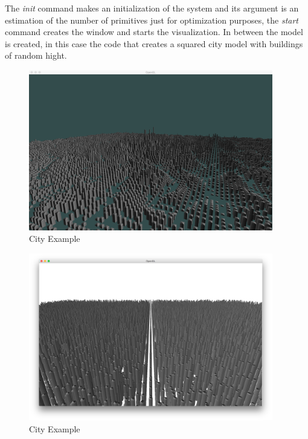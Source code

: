 The \emph{init} command makes an initialization of the system and its argument is an estimation of the number of primitives just for optimization purposes, the \emph{start} command creates the window and starts the visualization. In between the model is created, in this case the code that creates a squared city model with buildings of random hight.

\begin{figure}[htb]
	\centering
	\includegraphics[width=0.95\textwidth]{img/Solution/City2-100*100.png}
	\caption{City Example}
	\label{fig:pic1}
\end{figure}

\begin{figure}[htb]
	\centering
	\includegraphics[width=0.95\textwidth]{img/Solution/City4-racket.png}
	\caption{City Example}
	\label{fig:pic1}
\end{figure}



